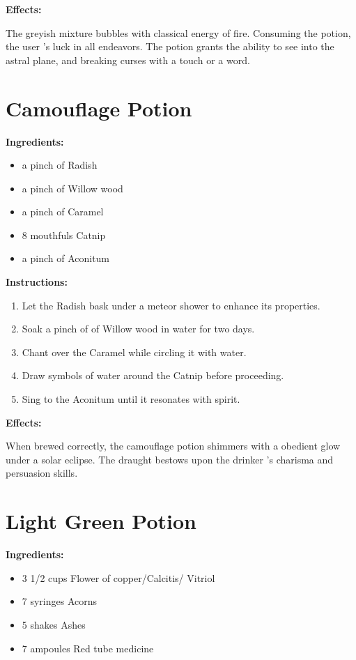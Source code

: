 \documentclass{article}
\begin{document}
\textbf{Effects:}

The greyish mixture bubbles with classical energy of fire. Consuming the potion, the user 's luck in all endeavors. The potion grants the ability to see into the astral plane, and breaking curses with a touch or a word.

\newpage
\section*{Camouflage Potion}

\textbf{Ingredients:}

\begin{itemize}
  \item a pinch of Radish
  \item a pinch of Willow wood
  \item a pinch of Caramel
  \item 8 mouthfuls Catnip
  \item a pinch of Aconitum
\end{itemize}

\textbf{Instructions:}

\begin{enumerate}
  \item Let the Radish bask under a meteor shower to enhance its properties.
  \item Soak a pinch of of Willow wood in water for two days.
  \item Chant over the Caramel while circling it with water.
  \item Draw symbols of water around the Catnip before proceeding.
  \item Sing to the Aconitum until it resonates with spirit.
\end{enumerate}

\textbf{Effects:}

When brewed correctly, the camouflage potion shimmers with a obedient glow under a solar eclipse. The draught bestows upon the drinker 's charisma and persuasion skills.

\newpage
\section*{Light Green Potion}

\textbf{Ingredients:}

\begin{itemize}
  \item 3 1/2 cups Flower of copper/Calcitis/ Vitriol
  \item 7 syringes Acorns
  \item 5 shakes Ashes
  \item 7 ampoules Red tube medicine
\end{itemize}
\end{document}

